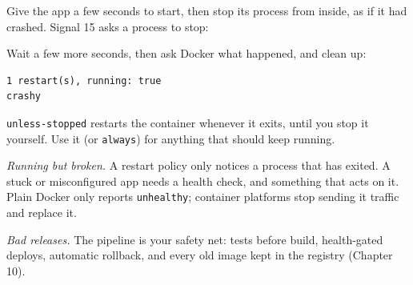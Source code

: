
Give the app a few seconds to start, then stop its process from inside, as if it had crashed. Signal 15 asks a process to stop:

\begin{codeblock}

\begin{Shaded}
\begin{Highlighting}[]
 
\end{Highlighting}
\end{Shaded}

\end{codeblock}


Wait a few more seconds, then ask Docker what happened, and clean up:

\begin{codeblock}

\begin{Shaded}
\begin{Highlighting}[]
 
\end{Highlighting}
\end{Shaded}

\end{codeblock}

\begin{codeblock}
\begin{Verbatim}[formatcom=\outputstyle]
1 restart(s), running: true
crashy
\end{Verbatim}
\end{codeblock}

\texttt{unless-stopped} restarts the container whenever it exits, until you stop it yourself. Use it (or \texttt{always}) for anything that should keep running.

\emph{Running but broken.} A restart policy only notices a process that has exited. A stuck or misconfigured app needs a health check, and something that acts on it. Plain Docker only reports \texttt{unhealthy}; container platforms stop sending it traffic and replace it.

\emph{Bad releases.} The pipeline is your safety net: tests before build, health-gated deploys, automatic rollback, and every old image kept in the registry (Chapter 10).

